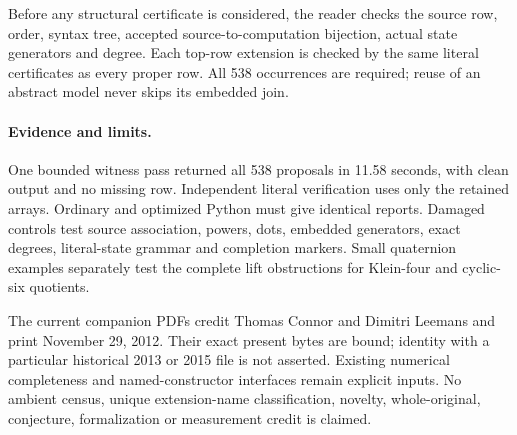 \documentclass[11pt]{article}
\begin{document}
Before any structural certificate is considered, the reader checks the
source row, order, syntax tree, accepted source-to-computation bijection,
actual state generators and degree. Each top-row extension is checked
by the same literal certificates as every proper row. All 538 occurrences
are required; reuse of an abstract model never skips its embedded join.

\paragraph{Evidence and limits.}
One bounded witness pass returned all 538 proposals in 11.58 seconds,
with clean output and no missing row. Independent literal verification
uses only the retained arrays. Ordinary and optimized Python must give
identical reports. Damaged controls test source association, powers,
dots, embedded generators, exact degrees, literal-state grammar and
completion markers. Small quaternion examples separately test the complete
lift obstructions for Klein-four and cyclic-six quotients.

The current companion PDFs credit Thomas Connor and Dimitri Leemans and
print November 29, 2012. Their exact present bytes are bound; identity
with a particular historical 2013 or 2015 file is not asserted. Existing
numerical completeness and named-constructor interfaces remain explicit
inputs. No ambient census, unique extension-name classification, novelty,
whole-original, conjecture, formalization or measurement credit is claimed.
\end{document}
